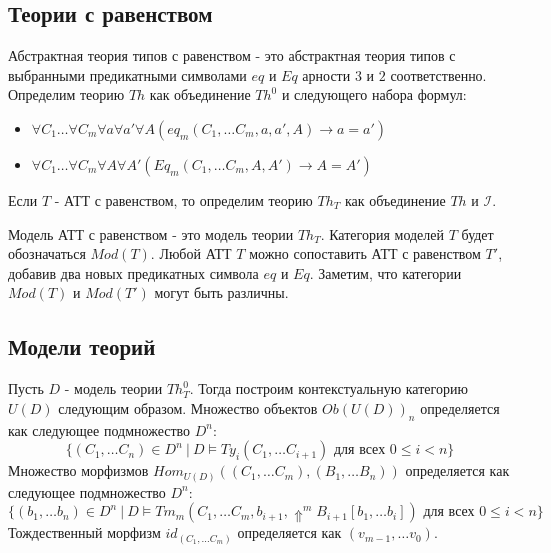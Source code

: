 \documentclass{amsart}
\theoremstyle{definition}
\theoremstyle{remark}
\numberwithin{figure}{section}
\begin{document}
\begin{comment}
\begin{defn}
\emph{Модель абстрактной теории типов} $T$ - это модель теории $Th^0_T$.
\end{defn}

Модели $T$ образуют категорию, это просто категория моделей $Th^0_T$.
Мы будем обозначать эту категорию $Mod(T)$.
\end{comment}

\subsection{Теории с равенством}

Абстрактная теория типов с равенством - это абстрактная теория типов с выбранными предикатными символами $eq$ и $Eq$ арности $3$ и $2$ соответственно.
Определим теорию $Th$ как объединение $Th^0$ и следующего набора формул:
\begin{itemize}
\item $\forall C_1 \ldots \forall C_m \forall a \forall a' \forall A (eq_m(C_1, \ldots C_m, a, a', A) \to a = a')$
\item $\forall C_1 \ldots \forall C_m \forall A \forall A' (Eq_m(C_1, \ldots C_m, A, A') \to A = A')$
\end{itemize}
Если $T$ - АТТ с равенством, то определим теорию $Th_T$ как объединение $Th$ и $\mathcal{I}$.

Модель АТТ с равенством - это модель теории $Th_T$.
Категория моделей $T$ будет обозначаться $Mod(T)$.
Любой АТТ $T$ можно сопоставить АТТ с равенством $T'$, добавив два новых предикатных символа $eq$ и $Eq$.
Заметим, что категории $Mod(T)$ и $Mod(T')$ могут быть различны.

\subsection{Модели теорий}

Пусть $D$ - модель теории $Th^0_T$.
Тогда построим контекстуальную категорию $U(D)$ следующим образом.
Множество объектов $Ob(U(D))_n$ определяется как следующее подмножество $D^n$:
\[ \{ (C_1, \ldots C_n) \in D^n\ |\ D \models Ty_i(C_1, \ldots C_{i + 1}) \text{ для всех } 0 \leq i < n \} \]
Множество морфизмов $Hom_{U(D)}((C_1, \ldots C_m), (B_1, \ldots B_n))$ определяется как следующее подмножество $D^n$:
\[ \{ (b_1, \ldots b_n) \in D^n\ |\ D \models Tm_m(C_1, \ldots C_m, b_{i + 1}, \Uparrow^m B_{i + 1}[b_1, \ldots b_i]) \text{ для всех } 0 \leq i < n \} \]
Тождественный морфизм $id_{(C_1, \ldots C_m)}$ определяется как $(v_{m - 1}, \ldots v_0)$.
\end{document}
